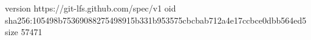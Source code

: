 version https://git-lfs.github.com/spec/v1
oid sha256:105498b75369088275498915b331b953575cbcbab712a4e17ccbce0dbb564ed5
size 57471
